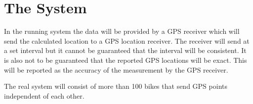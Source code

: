 \section{The System}
In the running system the data will be provided by a GPS receiver which will send the calculated location to a GPS location receiver.
The receiver will send at a set interval but it cannot be guaranteed that the interval will be consistent.
It is also not to be guaranteed that the reported GPS locations will be exact.
This will be reported as the accuracy of the measurement by the GPS receiver.

The real system will consist of more than 100 bikes that send GPS points independent of each other.